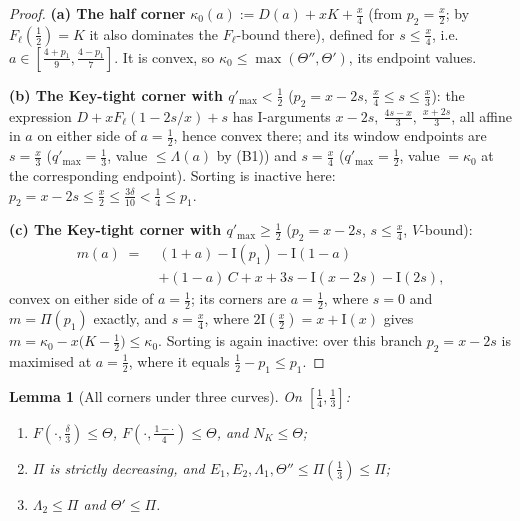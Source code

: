 \documentclass[journal]{IEEEtran}
\newtheorem{lemma}{Lemma}
\theoremstyle{definition}
\newcommand{\CC}{C}
\begin{document}
\begin{proof}
\textbf{(a) The half corner} $\kappa_0(a):=D(a)+xK+\tfrac x4$ \textup{(}from
$p_2=\tfrac x2$; by $F_\ell(\tfrac12)=K$ it also dominates the
$F_\ell$-bound there\textup{)}, defined for $s\le\tfrac x4$, i.e.\
$a\in[\tfrac{4+p_1}9,\tfrac{4-p_1}7]$. It is convex, so
$\kappa_0\le\max(\Theta'',\Theta')$, its endpoint values.

\textbf{(b) The Key-tight corner with $q'_{\max}<\tfrac12$}
\textup{(}$p_2=x-2s$, $\tfrac x4\le s\le\tfrac x3$\textup{)}: the
expression $D+xF_\ell(1-2s/x)+s$ has $\mathrm I$-arguments
$x-2s,\ \tfrac{4s-x}3,\ \tfrac{x+2s}3$, all affine in $a$ on either side
of $a=\tfrac12$, hence convex there; and its window endpoints are $s=\tfrac x3$
\textup{(}$q'_{\max}=\tfrac13$, value $\le\Lambda(a)$ by
\textup{(B1)}\textup{)} and $s=\tfrac x4$ \textup{(}$q'_{\max}=\tfrac12$,
value $=\kappa_0$ at the corresponding endpoint\textup{)}. Sorting is
inactive here: $p_2=x-2s\le\tfrac x2\le\tfrac{3\delta}{10}<\tfrac14\le p_1$.

\textbf{(c) The Key-tight corner with $q'_{\max}\ge\tfrac12$}
\textup{(}$p_2=x-2s$, $s\le\tfrac x4$, $V$-bound\textup{)}:
\[
\begin{aligned}
  m(a)\;=\;&(1+a)-\mathrm I(p_1)-\mathrm I(1-a)\\
  &+(1-a)\,\CC+x+3s-\mathrm I(x-2s)-\mathrm I(2s),
\end{aligned}
\]
convex on either side of $a=\tfrac12$; its corners are $a=\tfrac12$, where
$s=0$ and $m=\Pi(p_1)$ exactly, and $s=\tfrac x4$, where
$2\mathrm I(\tfrac x2)=x+\mathrm I(x)$ gives
$m=\kappa_0-x\bigl(K-\tfrac12\bigr)\le\kappa_0$. Sorting is again
inactive: over this branch $p_2=x-2s$ is maximised at $a=\tfrac12$, where
it equals $\tfrac12-p_1\le p_1$.
\end{proof}

\begin{lemma}[All corners under three curves]\label{lem:dom-q}
On $[\tfrac14,\tfrac13]$:
\begin{enumerate}
\item[\textup{(a)}] $F(\cdot,\tfrac\delta3)\le\Theta$,
$F(\cdot,\tfrac{1-\cdot}4)\le\Theta$, and $N_K\le\Theta$;
\item[\textup{(b)}] $\Pi$ is strictly decreasing, and
$E_1,E_2,\Lambda_1,\Theta''\le\Pi(\tfrac13)\le\Pi$;
\item[\textup{(c)}] $\Lambda_2\le\Pi$ and $\Theta'\le\Pi$.
\end{enumerate}
\end{lemma}
\end{document}
